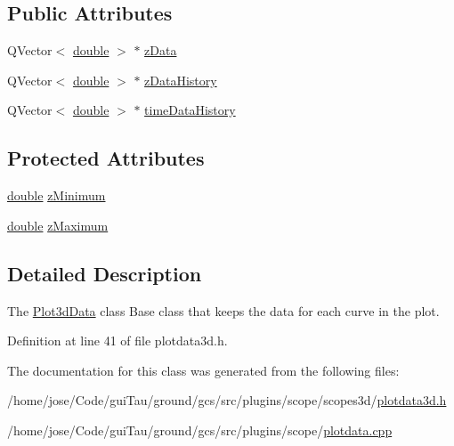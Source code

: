 \subsection*{Public Attributes}
\begin{DoxyCompactItemize}
\item 
Q\-Vector$<$ \hyperlink{_super_l_u_support_8h_a8956b2b9f49bf918deed98379d159ca7}{double} $>$ $\ast$ \hyperlink{group___scope_plugin_gad5607d9145f51871817c4094cd1ba250}{z\-Data}
\item 
Q\-Vector$<$ \hyperlink{_super_l_u_support_8h_a8956b2b9f49bf918deed98379d159ca7}{double} $>$ $\ast$ \hyperlink{group___scope_plugin_gab1e0ead20c4c64f78a8dafc2ae101710}{z\-Data\-History}
\item 
Q\-Vector$<$ \hyperlink{_super_l_u_support_8h_a8956b2b9f49bf918deed98379d159ca7}{double} $>$ $\ast$ \hyperlink{group___scope_plugin_ga92914eba20188371aeb3ad365c01acc4}{time\-Data\-History}
\end{DoxyCompactItemize}
\subsection*{Protected Attributes}
\begin{DoxyCompactItemize}
\item 
\hyperlink{_super_l_u_support_8h_a8956b2b9f49bf918deed98379d159ca7}{double} \hyperlink{group___scope_plugin_ga0938aa53ec304cabf25b8294dde0a5b0}{z\-Minimum}
\item 
\hyperlink{_super_l_u_support_8h_a8956b2b9f49bf918deed98379d159ca7}{double} \hyperlink{group___scope_plugin_ga1ad4417e8b0fb7035d1f4c85191812a0}{z\-Maximum}
\end{DoxyCompactItemize}


\subsection{Detailed Description}
The \hyperlink{class_plot3d_data}{Plot3d\-Data} class Base class that keeps the data for each curve in the plot. 

Definition at line 41 of file plotdata3d.\-h.



The documentation for this class was generated from the following files\-:\begin{DoxyCompactItemize}
\item 
/home/jose/\-Code/gui\-Tau/ground/gcs/src/plugins/scope/scopes3d/\hyperlink{plotdata3d_8h}{plotdata3d.\-h}\item 
/home/jose/\-Code/gui\-Tau/ground/gcs/src/plugins/scope/\hyperlink{plotdata_8cpp}{plotdata.\-cpp}\end{DoxyCompactItemize}
